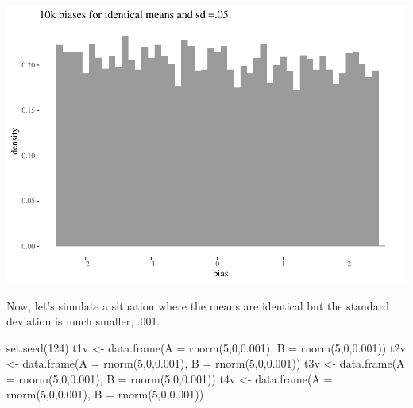 \documentclass[
  10pt,
  dvipsnames,enabledeprecatedfontcommands]{scrartcl}
\newenvironment{Shaded}{\begin{snugshade}}{\end{snugshade}}
\newcommand{\AttributeTok}[1]{\textcolor[rgb]{0.77,0.63,0.00}{#1}}
\newcommand{\DecValTok}[1]{\textcolor[rgb]{0.00,0.00,0.81}{#1}}
\newcommand{\FloatTok}[1]{\textcolor[rgb]{0.00,0.00,0.81}{#1}}
\newcommand{\FunctionTok}[1]{\textcolor[rgb]{0.00,0.00,0.00}{#1}}
\newcommand{\NormalTok}[1]{#1}
\newcommand{\OtherTok}[1]{\textcolor[rgb]{0.56,0.35,0.01}{#1}}
\begin{document}
\begin{center}\includegraphics[width=1\linewidth]{paperDraft_files/figure-latex/unnamed-chunk-4-1} \end{center}
\normalsize

Now, let's simulate a situation where the means are identical but the
standard deviation is much smaller, .001.

\footnotesize

\begin{Shaded}
\begin{Highlighting}[]
\FunctionTok{set.seed}\NormalTok{(}\DecValTok{124}\NormalTok{)}
\NormalTok{t1v }\OtherTok{\textless{}{-}} \FunctionTok{data.frame}\NormalTok{(}\AttributeTok{A  =} \FunctionTok{rnorm}\NormalTok{(}\DecValTok{5}\NormalTok{,}\DecValTok{0}\NormalTok{,}\FloatTok{0.001}\NormalTok{), }\AttributeTok{B =} \FunctionTok{rnorm}\NormalTok{(}\DecValTok{5}\NormalTok{,}\DecValTok{0}\NormalTok{,}\FloatTok{0.001}\NormalTok{))}
\NormalTok{t2v }\OtherTok{\textless{}{-}} \FunctionTok{data.frame}\NormalTok{(}\AttributeTok{A  =} \FunctionTok{rnorm}\NormalTok{(}\DecValTok{5}\NormalTok{,}\DecValTok{0}\NormalTok{,}\FloatTok{0.001}\NormalTok{), }\AttributeTok{B =} \FunctionTok{rnorm}\NormalTok{(}\DecValTok{5}\NormalTok{,}\DecValTok{0}\NormalTok{,}\FloatTok{0.001}\NormalTok{))}
\NormalTok{t3v }\OtherTok{\textless{}{-}} \FunctionTok{data.frame}\NormalTok{(}\AttributeTok{A  =} \FunctionTok{rnorm}\NormalTok{(}\DecValTok{5}\NormalTok{,}\DecValTok{0}\NormalTok{,}\FloatTok{0.001}\NormalTok{), }\AttributeTok{B =} \FunctionTok{rnorm}\NormalTok{(}\DecValTok{5}\NormalTok{,}\DecValTok{0}\NormalTok{,}\FloatTok{0.001}\NormalTok{))}
\NormalTok{t4v }\OtherTok{\textless{}{-}} \FunctionTok{data.frame}\NormalTok{(}\AttributeTok{A  =} \FunctionTok{rnorm}\NormalTok{(}\DecValTok{5}\NormalTok{,}\DecValTok{0}\NormalTok{,}\FloatTok{0.001}\NormalTok{), }\AttributeTok{B =} \FunctionTok{rnorm}\NormalTok{(}\DecValTok{5}\NormalTok{,}\DecValTok{0}\NormalTok{,}\FloatTok{0.001}\NormalTok{))}
\end{Highlighting}
\end{Shaded}
\end{document}
